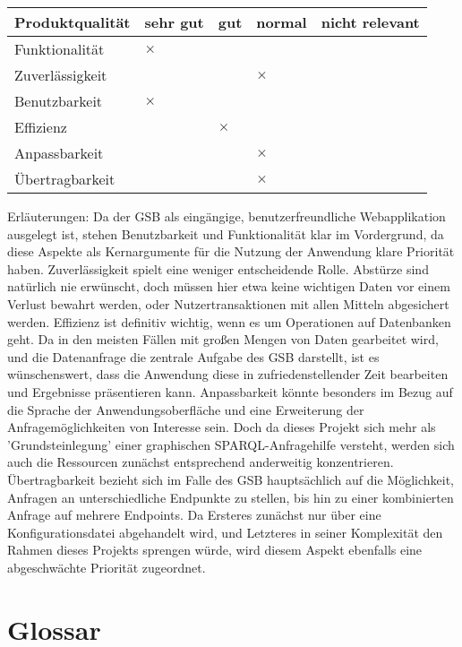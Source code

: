 \begin{table}[!h]
  \begin{tabular}{l l l l l}
\toprule
Produktqualität & sehr gut & gut & normal & nicht relevant \\\midrule

Funktionalität & $\times$ \\
Zuverlässigkeit &&& $\times$ \\
Benutzbarkeit &  $\times$ \\
Effizienz  && $\times$ \\
Anpassbarkeit &&& $\times$ \\
Übertragbarkeit &&& $\times$ \\
\bottomrule
\end{tabular}
\end{table}

Erläuterungen:
Da der GSB als eingängige, benutzerfreundliche Webapplikation ausgelegt ist, stehen Benutzbarkeit und Funktionalität klar im Vordergrund, da diese Aspekte als Kernargumente für die Nutzung der Anwendung klare Priorität haben.
Zuverlässigkeit spielt eine weniger entscheidende Rolle. Abstürze sind natürlich nie erwünscht, doch müssen hier etwa keine wichtigen Daten vor einem Verlust bewahrt werden, oder Nutzertransaktionen mit allen Mitteln abgesichert werden.
Effizienz ist definitiv wichtig, wenn es um Operationen auf Datenbanken geht. Da in den meisten Fällen mit großen Mengen von Daten gearbeitet wird, und die Datenanfrage die zentrale Aufgabe des GSB darstellt, ist es wünschenswert, dass die Anwendung diese in zufriedenstellender Zeit bearbeiten und Ergebnisse präsentieren kann.
Anpassbarkeit könnte besonders im Bezug auf die Sprache der Anwendungsoberfläche und eine Erweiterung der Anfragemöglichkeiten von Interesse sein. Doch da dieses Projekt sich mehr als 'Grundsteinlegung' einer graphischen SPARQL-Anfragehilfe versteht, werden sich auch die Ressourcen zunächst entsprechend anderweitig konzentrieren.
Übertragbarkeit bezieht sich im Falle des GSB  hauptsächlich auf die Möglichkeit, Anfragen an unterschiedliche Endpunkte zu stellen, bis hin zu einer kombinierten Anfrage auf mehrere Endpoints. Da Ersteres zunächst nur über eine Konfigurationsdatei abgehandelt wird, und Letzteres in seiner Komplexität den Rahmen dieses Projekts sprengen würde, wird diesem Aspekt ebenfalls eine abgeschwächte Priorität zugeordnet.


\section{Glossar}

